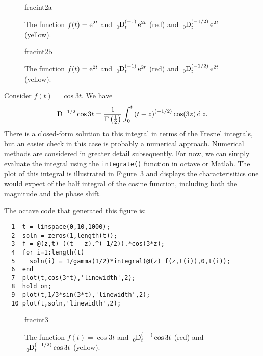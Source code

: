 \begin{figure}
  \centering
  {fracint2a}
\caption{The function $f(t) = \operatorname{e}^{2 t}$ and $\tensor*[_0]{\D}{^{(-1)}_t} \e^{2t}$ (red) and $\tensor*[_0]{\D}{^{(-1/2)}_t} \e^{2t}$ (yellow).}
  \label{fig:fracint2a}
\end{figure}

\begin{figure}
  \centering
  {fracint2b}
\caption{The function $f(t) = \operatorname{e}^{2 t}$ and $\tensor*[_0]{\D}{^{(-1)}_t} \e^{2t}$ (red) and $\tensor*[_0]{\D}{^{(-1/2)}_t} \e^{2t}$ (yellow).}
  \label{fig:fracint2b}
\end{figure}

\begin{example}
  Consider $f(t) = \cos 3 t$. We have
  \begin{equation*}
    \tensor*[]{\D}{^{-1/2}} \cos 3 t = \frac{1}{\Gamma \left( \frac{1}{2} \right) } \int_0^t \left( t - z \right)^{\left( -1/2 \right)} \cos(3z) \d{z}.
  \end{equation*}
  There is a closed-form solution to this integral in terms of the Fresnel integrals, but an easier check in this case
  is probably a numerical approach. Numerical methods are considered in greater detail subsequently. For now, we can
  simply evaluate the integral using the \texttt{integrate()} function in octave or Matlab. The plot of this integral is
  illustrated in Figure~\ref{fig:fracint3} and displays the characterisitics one would expect of the half integral of
  the cosine function, including both the magnitude and the phase shift.  

  The octave code that generated this figure is:
  \begin{verbatim}
  1  t = linspace(0,10,1000);
  2  soln = zeros(1,length(t));
  3  f = @(z,t) ((t - z).^(-1/2)).*cos(3*z);
  4  for i=1:length(t)
  5    soln(i) = 1/gamma(1/2)*integral(@(z) f(z,t(i)),0,t(i));
  6  end
  7  plot(t,cos(3*t),'linewidth',2);
  8  hold on;
  9  plot(t,1/3*sin(3*t),'linewidth',2);
  10 plot(t,soln,'linewidth',2);
  \end{verbatim}
\end{example}

\begin{figure}
  \centering
  {fracint3}
\caption{The function $f(t) = \cos 3 t$ and $\tensor*[_0]{\D}{^{(-1)}_t} \cos 3 t$ (red) and $\tensor*[_0]{\D}{^{(-1/2)}_t} \cos 3t$ (yellow).}
  \label{fig:fracint3}
\end{figure}

